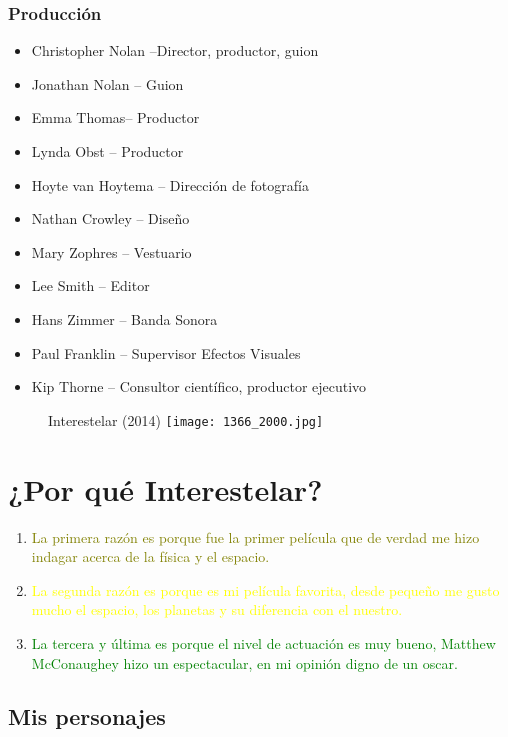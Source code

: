 \documentclass[a5paper, 11pt]{article}
\begin{document}
\begin{itemize}
  \subsubsection{Producción}
  \begin{itemize}
   \item Christopher Nolan –Director, productor, guion
   \item Jonathan Nolan – Guion
   \item Emma Thomas– Productor
   \item Lynda Obst – Productor
   \item Hoyte van Hoytema – Dirección de fotografía
   \item Nathan Crowley – Diseño
   \item Mary Zophres – Vestuario
   \item Lee Smith – Editor
   \item Hans Zimmer – Banda Sonora
   \item Paul Franklin – Supervisor Efectos Visuales
   \item Kip Thorne – Consultor científico, productor ejecutivo
  \end{itemize}
  \end{itemize}
\begin{figure}[H]
\caption{\raggedleft}{Interestelar (2014)}
\raggedleft
\texttt{[image: 1366\_2000.jpg]}

\label{fig:my_label}
\end{figure}

\section{¿Por qué Interestelar?}

\begin{enumerate}
    \item {\textcolor{olive}{La primera razón es porque fue la primer película que de verdad me hizo indagar acerca de la física y el espacio.}}
    \item {\textcolor{yellow}{La segunda razón es porque es mi película favorita, desde pequeño me gusto mucho el espacio, los planetas y su diferencia con el nuestro.}}
    \item {\textcolor{green}{La tercera y última es porque el nivel de actuación es muy bueno, Matthew McConaughey hizo un espectacular, en mi opinión digno de un oscar.}}
\end{enumerate}
\subsection{Mis personajes}
\end{document}
